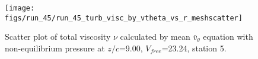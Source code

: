 \begin{figure}[H]
\centering
\texttt{[image: figs/run\_45/run\_45\_turb\_visc\_by\_vtheta\_vs\_r\_meshscatter]}
\caption{Scatter plot of total viscosity $\nu$ calculated by mean $\bar{v}_{\theta}$ equation with non-equilibrium pressure at $z/c$=9.00, $V_{free}$=23.24, station 5.}
\label{fig:run_45_turb_visc_by_vtheta_vs_r_meshscatter}
\end{figure}


